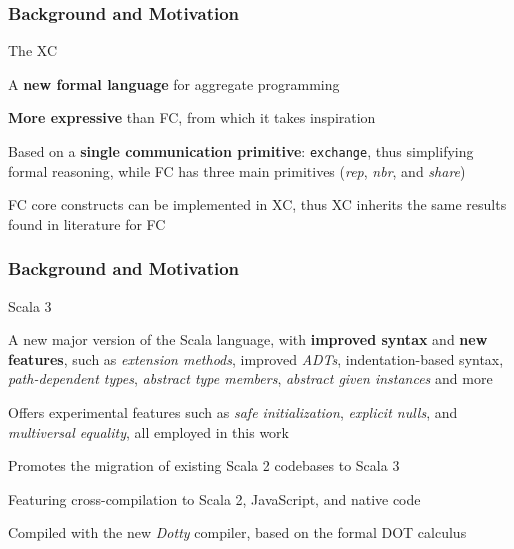 \begin{frame}
    \frametitle{Background and Motivation}
    \begin{blockitems}{The \ac{XC}}
        \item A \textbf{new formal language} for aggregate programming~\cite{xc}
        \item \textbf{More expressive} than \ac{FC}, from which it takes inspiration
        \item Based on a \textbf{single communication primitive}: \texttt{exchange}, thus simplifying formal reasoning, while \ac{FC} has three main primitives (\textit{rep}, \textit{nbr}, and \textit{share})
        \item \ac{FC} core constructs can be implemented in \ac{XC}, thus \ac{XC} inherits the same results found in literature for \ac{FC}
    \end{blockitems}
\end{frame}

\begin{frame}
    \frametitle{Background and Motivation}
    \begin{blockitems}{Scala 3}
        \item A new major version of the Scala language, with \textbf{improved syntax} and \textbf{new features}, such as \textit{extension methods}, improved \textit{\acp{ADT}}, indentation-based syntax, \textit{path-dependent types}, \textit{abstract type members}, \textit{abstract given instances} and more
        \item Offers experimental features such as \textit{safe initialization}, \textit{explicit nulls}, and \textit{multiversal equality}, all employed in this work
        \item Promotes the migration of existing Scala 2 codebases to Scala 3
        \item Featuring cross-compilation to Scala 2, JavaScript, and native code
        \item Compiled with the new \textit{Dotty} compiler, based on the formal \ac{DOT} calculus
    \end{blockitems}
\end{frame}

